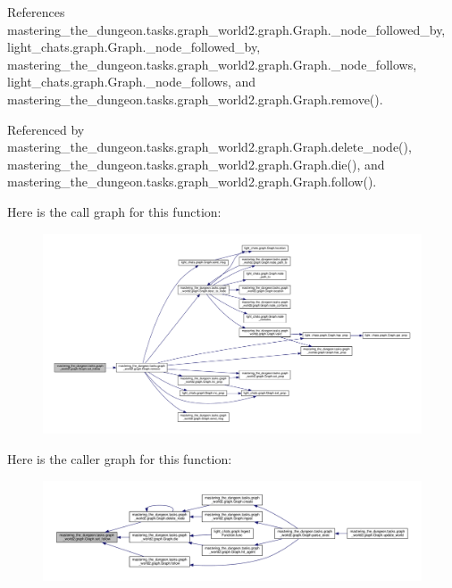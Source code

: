References mastering\+\_\+the\+\_\+dungeon.\+tasks.\+graph\+\_\+world2.\+graph.\+Graph.\+\_\+node\+\_\+followed\+\_\+by, light\+\_\+chats.\+graph.\+Graph.\+\_\+node\+\_\+followed\+\_\+by, mastering\+\_\+the\+\_\+dungeon.\+tasks.\+graph\+\_\+world2.\+graph.\+Graph.\+\_\+node\+\_\+follows, light\+\_\+chats.\+graph.\+Graph.\+\_\+node\+\_\+follows, and mastering\+\_\+the\+\_\+dungeon.\+tasks.\+graph\+\_\+world2.\+graph.\+Graph.\+remove().



Referenced by mastering\+\_\+the\+\_\+dungeon.\+tasks.\+graph\+\_\+world2.\+graph.\+Graph.\+delete\+\_\+node(), mastering\+\_\+the\+\_\+dungeon.\+tasks.\+graph\+\_\+world2.\+graph.\+Graph.\+die(), and mastering\+\_\+the\+\_\+dungeon.\+tasks.\+graph\+\_\+world2.\+graph.\+Graph.\+follow().

Here is the call graph for this function\+:
\nopagebreak
\begin{figure}[H]
\begin{center}
\leavevmode
\includegraphics[width=350pt]{classmastering__the__dungeon_1_1tasks_1_1graph__world2_1_1graph_1_1Graph_a2ff0825e34c0894b86cef3a5076348ed_cgraph}
\end{center}
\end{figure}
Here is the caller graph for this function\+:
\nopagebreak
\begin{figure}[H]
\begin{center}
\leavevmode
\includegraphics[width=350pt]{classmastering__the__dungeon_1_1tasks_1_1graph__world2_1_1graph_1_1Graph_a2ff0825e34c0894b86cef3a5076348ed_icgraph}
\end{center}
\end{figure}
\mbox{\label{classmastering__the__dungeon_1_1tasks_1_1graph__world2_1_1graph_1_1Graph_ace895c0ddc2b66808fa28f6a383574f1}} 
